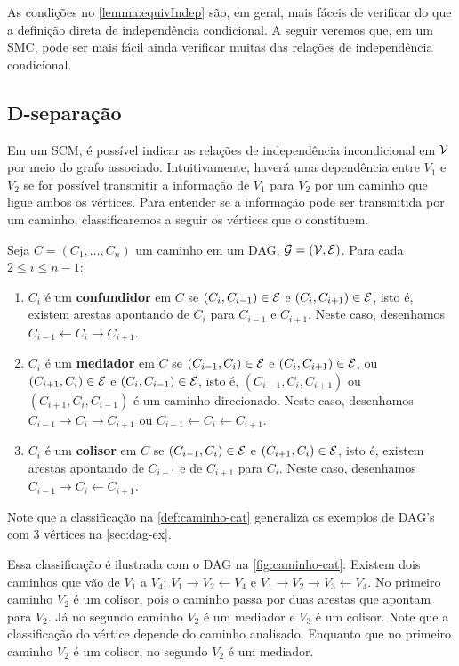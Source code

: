 As condições no \cref{lemma:equivIndep} são, em geral,
mais fáceis de verificar do que 
a definição direta de independência condicional.
A seguir veremos que, em um SMC, pode
ser mais fácil ainda verificar
muitas das relações de independência condicional.

\subsection{D-separação}

Em um SCM, é possível indicar 
as relações de independência incondicional em ${\mathcal V}$
por meio do grafo associado.
Intuitivamente, haverá uma dependência
entre $V_1$ e $V_2$ se for possível
transmitir a informação de $V_1$ para $V_2$
por um caminho que ligue ambos os vértices.
Para entender se a informação 
pode ser transmitida por um caminho,
classificaremos a seguir os vértices que o constituem.

\begin{definition}
 \label{def:caminho-cat}
 Seja $C = (C_1,\ldots,C_n)$ um caminho 
 em um DAG, ${\mathcal G} = ({\mathcal V},{\mathcal E})$.
 Para cada $2 \leq i \leq n-1$:
 \begin{enumerate}
  \item $C_i$ é um \textbf{confundidor} em $C$ se
  $(C_i,C_{i-1}) \in {\mathcal E}$ e $(C_i,C_{i+1}) \in {\mathcal E}$,
  isto é, existem arestas apontando de $C_i$ para
  $C_{i-1}$ e $C_{i+1}$. Neste caso, desenhamos
  $C_{i-1} \leftarrow C_i \rightarrow C_{i+1}$.
  \item $C_i$ é um \textbf{mediador} em $C$ se
  $(C_{i-1},C_{i}) \in {\mathcal E}$ e $(C_i,C_{i+1}) \in {\mathcal E}$, ou
  $(C_{i+1},C_{i}) \in {\mathcal E}$ e $(C_i,C_{i-1}) \in {\mathcal E}$,
  isto é, $(C_{i-1},C_i,C_{i+1})$ ou $(C_{i+1},C_i,C_{i-1})$ é 
  um caminho direcionado. Neste caso, desenhamos
  $C_{i-1} \rightarrow C_i \rightarrow C_{i+1}$ ou
  $C_{i-1} \leftarrow C_i \leftarrow C_{i+1}$.
  \item $C_i$ é um \textbf{colisor} em $C$ se
  $(C_{i-1},C_{i}) \in {\mathcal E}$ e $(C_{i+1},C_{i}) \in {\mathcal E}$,
  isto é, existem arestas apontando de $C_{i-1}$ e de $C_{i+1}$ 
  para $C_{i}$. Neste caso, desenhamos
  $C_{i-1} \rightarrow C_i \leftarrow C_{i+1}$.
 \end{enumerate}
\end{definition}

Note que a classificação na \cref{def:caminho-cat}
generaliza os exemplos de DAG's com 3 vértices 
na \cref{sec:dag-ex}. 

Essa classificação é ilustrada com 
o DAG na \cref{fig:caminho-cat}.
Existem dois caminhos que vão de $V_1$ a $V_4$:
$V_1 \rightarrow V_2 \leftarrow V_4$ e
$V_1 \rightarrow V_2 \rightarrow V_3 \leftarrow V_4$.
No primeiro caminho $V_2$ é um colisor, pois
o caminho passa por duas arestas que apontam para $V_2$.
Já no segundo caminho $V_2$ é um mediador e
$V_3$ é um colisor.
Note que a classificação do vértice depende 
do caminho analisado.
Enquanto que no primeiro caminho $V_2$ é um colisor,
no segundo $V_2$ é um mediador.

